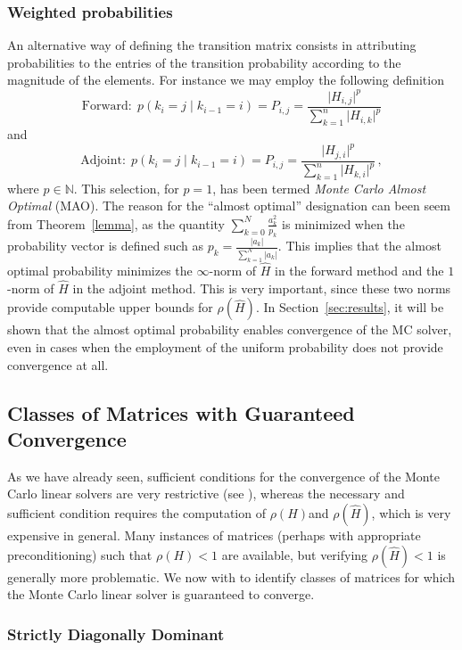 \subsubsection{Weighted probabilities}

An alternative way of defining the transition matrix consists in attributing
probabilities to the entries of the transition probability according
to the magnitude of the elements. For instance we may employ the following
definition
\[
\text{Forward}: \;
p(k_i=j \;\lvert\;k_{i-1}=i )=P_{i,j}=\frac{\lvert
H_{i,j}\rvert^p}{\sum_{k=1}^n
\lvert H_{i,k}\rvert^p}
\]
and
\[
\text{Adjoint}: \;
p(k_i=j \;\lvert\;k_{i-1}=i )=P_{i,j}=\frac{\lvert
H_{j,i}\rvert^p}{\sum_{k=1}^n
\lvert H_{k,i}\rvert^p} \,,
\]
where $p\in \mathbb{N}$.
This selection, for $p=1$, has been termed
\textit{Monte Carlo Almost Optimal} (MAO).
The reason for the ``almost optimal'' designation can been seem from
Theorem~\ref{lemma}, as the quantity
$\displaystyle \sum_{k=0}^N\frac{a_k^2}{p_k}$
is minimized when the probability vector is
defined such as $\displaystyle p_k=\frac{\lvert a_k\rvert}{\sum_{k=1}^N \lvert
a_k\rvert}$. This implies that the almost optimal probability minimizes the
$\infty$-norm of $\hat{H}$ in the forward method and the $1$-norm of $\hat{H}$
in the adjoint method. This is very important, since these two norms
provide computable upper bounds for $\rho(\hat{H})$.
In Section~\ref{sec:results}, it will be shown
that the almost optimal probability enables convergence of the MC solver,
even in cases when the employment of the uniform probability does not provide
convergence at all.

\subsection{Classes of Matrices with Guaranteed Convergence}

As we have already seen, sufficient conditions for
the convergence of the Monte Carlo linear solvers are very restrictive (see
\cite{MASC2013}), whereas the necessary and sufficient condition requires the
computation of $\rho(H)$and $\rho(\hat{H})$, which is very expensive in general.
Many instances of matrices (perhaps with appropriate preconditioning) such
that $\rho(H)<1$ are available, but verifying $\rho(\hat{H})<1$ is generally
more problematic.  We now with to identify classes of matrices for which
the Monte Carlo linear solver is guaranteed to converge.

\subsubsection{Strictly Diagonally Dominant}
\label{sec:sdd}

